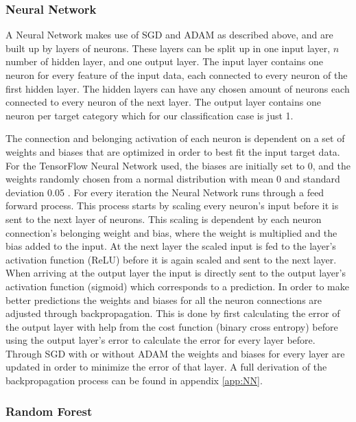 \documentclass[11pt]{article}
\begin{document}
\subsubsection*{Neural Network}
A Neural Network makes use of SGD and ADAM as described above, and are built up by layers of neurons. These layers can be split up in one input layer, $n$ number of hidden layer, and one output layer. The input layer contains one neuron for every feature of the input data, each connected to every neuron of the first hidden layer. The hidden layers can have any chosen amount of neurons each connected to every neuron of the next layer. The output layer contains one neuron per target category which for our classification case is just 1.

The connection and belonging activation of each neuron is dependent on a set of weights and biases that are optimized in order to best fit the input target data. For the TensorFlow Neural Network used, the biases are initially set to 0, and the weights randomly chosen from a normal distribution with mean 0 and standard deviation 0.05 \cite{tf}. For every iteration the Neural Network runs through a feed forward process. This process starts by scaling every neuron's input before it is sent to the next layer of neurons. This scaling is dependent by each neuron connection's belonging weight and bias, where the weight is multiplied and the bias added to the input. At the next layer the scaled input is fed to the layer's activation function (ReLU) before it is again scaled and sent to the next layer. When arriving at the output layer the input is directly sent to the output layer's activation function (sigmoid) which corresponds to a prediction. In order to make better predictions the weights and biases for all the neuron connections are adjusted through backpropagation. This is done by first calculating the error of the output layer with help from the cost function (binary cross entropy) before using the output layer's error to calculate the error for every layer before.  Through SGD with or without ADAM the weights and biases for every layer are updated in order to minimize the error of that layer. A full derivation of the backpropagation process can be found in appendix \ref{app:NN}.
\subsubsection*{Random Forest}


\end{document}
